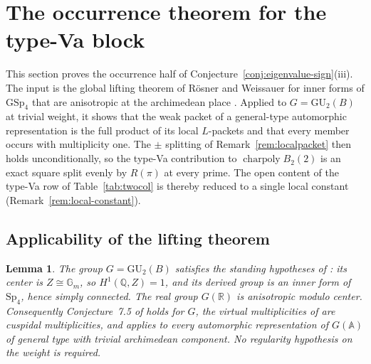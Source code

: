 \documentclass[11pt]{amsart}
\theoremstyle{plain}
\newtheorem{lemma}[theorem]{Lemma}
\theoremstyle{definition}
\newcommand{\Q}{\mathbb{Q}}
\newcommand{\R}{\mathbb{R}}
\newcommand{\GU}{\mathrm{GU}}
\newcommand{\GSp}{\mathrm{GSp}}
\newcommand{\Sp}{\mathrm{Sp}}
\DeclareMathOperator{\charp}{charpoly}
\providecommand{\charp}{\operatorname{charpoly}}
\begin{document}
	\section{The occurrence theorem for the type-Va block}
	\label{sec:occurrence}
	
	This section proves the occurrence half of
	Conjecture~\ref{conj:eigenvalue-sign}\textup{(iii)}. The input is the
	global lifting theorem of R\"osner and Weissauer for inner forms of
	$\GSp_4$ that are anisotropic at the archimedean place
	\cite[Thm.~11.4]{RoesnerWeissauer2021}. Applied to $G=\GU_2(B)$ at
	trivial weight, it shows that the weak packet of a general-type
	automorphic representation is the full product of its local $L$-packets
	and that every member occurs with multiplicity one. The $\pm$ splitting
	of Remark~\ref{rem:localpacket} then holds unconditionally, so the
	type-Va contribution to $\charp B_2(2)$ is an exact square split evenly
	by $R(\pi)$ at every prime. The open content of the type-Va row of
	Table~\ref{tab:twocol} is thereby reduced to a single local constant
	(Remark~\ref{rem:local-constant}).
	
	\subsection{Applicability of the lifting theorem}
	\label{ss:rw-applicability}
	
	\begin{lemma}
		\label{lem:rw-applicable}
		The group $G=\GU_2(B)$ satisfies the standing hypotheses of
		\cite[\S1]{RoesnerWeissauer2021}: its center is
		$Z\cong\mathbb{G}_m$, so $H^1(\Q,Z)=1$, and its derived group is an
		inner form of $\Sp_4$, hence simply connected. The real group
		$G(\R)$ is anisotropic modulo center. Consequently Conjecture~7.5 of
		\cite{RoesnerWeissauer2021} holds for $G$, the virtual
		multiplicities of \cite[\S9]{RoesnerWeissauer2021} are cuspidal
		multiplicities, and \cite[Thm.~11.4]{RoesnerWeissauer2021} applies
		to every automorphic representation of $G(\mathbb{A})$ of general
		type with trivial archimedean component. No regularity hypothesis on
		the weight is required.
	\end{lemma}
	
\end{document}
